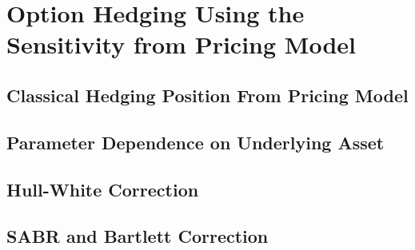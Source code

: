 \documentclass[letterpaper,12pt,titlepage,oneside,final]{book}
\numberwithin{equation}{section}
\theoremstyle{definition}
\let\origdoublepage\cleardoublepage
\newcommand{\clearemptydoublepage}{%
  \clearpage{\pagestyle{empty}\origdoublepage}}
\let\cleardoublepage\clearemptydoublepage
\begin{document}
\section{Option Hedging Using the Sensitivity from Pricing Model}
\subsection{Classical Hedging Position From Pricing Model}
\subsection{Parameter Dependence on Underlying Asset}
\subsection{Hull-White Correction}
\subsection{SABR and Bartlett Correction}






\cleardoublepage %
\renewcommand*{\bibname}{References}



\end{document}

